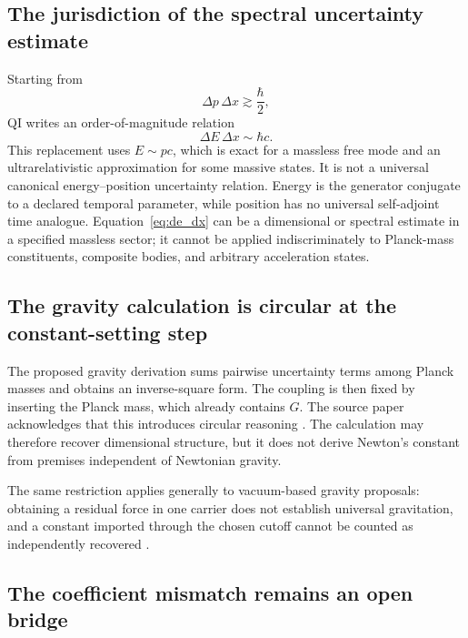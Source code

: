 \documentclass[11pt]{article}
\begin{document}
\subsection{The jurisdiction of the spectral uncertainty estimate}

Starting from
\begin{equation}
    \Delta p\,\Delta x\gtrsim \frac{\hbar}{2},
\end{equation}
QI writes an order-of-magnitude relation
\begin{equation}
    \Delta E\,\Delta x\sim\hbar c.
    \label{eq:de_dx}
\end{equation}
This replacement uses \(E\sim pc\), which is exact for a massless free mode and an ultrarelativistic approximation for some massive states. It is not a universal canonical energy--position uncertainty relation. Energy is the generator conjugate to a declared temporal parameter, while position has no universal self-adjoint time analogue. Equation~\eqref{eq:de_dx} can be a dimensional or spectral estimate in a specified massless sector; it cannot be applied indiscriminately to Planck-mass constituents, composite bodies, and arbitrary acceleration states.

\subsection{The gravity calculation is circular at the constant-setting step}

The proposed gravity derivation sums pairwise uncertainty terms among Planck masses and obtains an inverse-square form. The coupling is then fixed by inserting the Planck mass, which already contains \(G\). The source paper acknowledges that this introduces circular reasoning \cite{McCulloch2016}. The calculation may therefore recover dimensional structure, but it does not derive Newton's constant from premises independent of Newtonian gravity.

The same restriction applies generally to vacuum-based gravity proposals: obtaining a residual force in one carrier does not establish universal gravitation, and a constant imported through the chosen cutoff cannot be counted as independently recovered \cite{Puthoff1989,Carlip1993,Cole2001}.

\subsection{The coefficient mismatch remains an open bridge}
\end{document}

